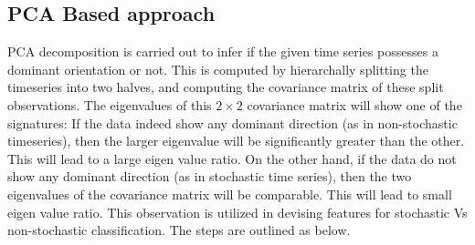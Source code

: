 \documentclass[journal]{IEEEtran}
\begin{document}
	\subsection{PCA Based approach}
	
	PCA  decomposition is carried out to infer if the given time series possesses a dominant orientation or not. This is computed by hierarchally splitting the timeseries into two halves, and computing the covariance matrix of these split observations. The eigenvalues of this $2 \times 2$ covariance matrix will show one of the signatures: If the data indeed show any dominant direction (as in non-stochastic timeseries), then the larger eigenvalue will be significantly greater than the other. This will lead to a large eigen value ratio. On the other hand, if the data do not show any dominant direction (as in stochastic time series), then the two eigenvalues of the covariance matrix will be comparable. This will lead to small eigen value ratio. This observation is utilized in devising features for stochastic Vs non-stochastic classification. The steps are outlined as below.
	
\end{document}
